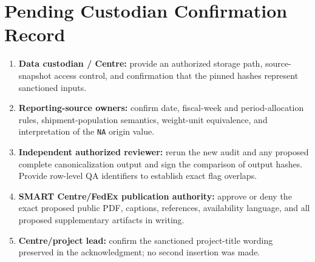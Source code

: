 \documentclass[11pt]{article}
\begin{document}
\section{Pending Custodian Confirmation Record}
\begin{enumerate}
\item \textbf{Data custodian / Centre:} provide an authorized storage path, source-snapshot access control, and confirmation that the pinned hashes represent sanctioned inputs.
\item \textbf{Reporting-source owners:} confirm date, fiscal-week and period-allocation rules, shipment-population semantics, weight-unit equivalence, and interpretation of the \texttt{NA} origin value.
\item \textbf{Independent authorized reviewer:} rerun the new audit and any proposed complete canonicalization output and sign the comparison of output hashes. Provide row-level QA identifiers to establish exact flag overlaps.
\item \textbf{SMART Centre/FedEx publication authority:} approve or deny the exact proposed public PDF, captions, references, availability language, and all proposed supplementary artifacts in writing.
\item \textbf{Centre/project lead:} confirm the sanctioned project-title wording preserved in the acknowledgment; no second insertion was made.
\end{enumerate}
\end{document}
